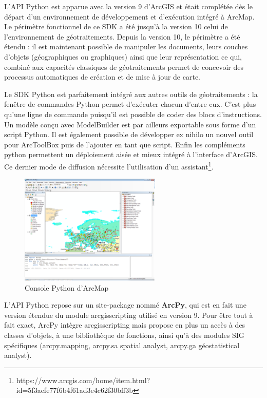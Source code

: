 \documentclass[11pt]{article}
\begin{document}
L'API Python est apparue avec la version 9 d'ArcGIS et était complétée dès le départ d'un environnement de développement et d'exécution intégré à ArcMap. Le périmètre fonctionnel de ce SDK a été jusqu’à la version 10 celui de l’environnement de géotraitements. Depuis la version 10, le périmètre a été étendu : il est maintenant possible de manipuler les documents, leurs couches d’objets (géographiques ou graphiques) ainsi que leur représentation ce qui, combiné aux capacités classiques de géotraitements permet de concevoir des processus automatiques de création et de mise à jour de carte. 

Le SDK Python est parfaitement intégré aux autres outils de géotraitements : la fenêtre de commandes Python permet d’exécuter chacun d’entre eux. C’est plus qu’une ligne de commande puisqu’il est possible de coder des blocs d’instructions. Un modèle conçu avec ModelBuilder est par ailleurs exportable sous forme d’un script Python. Il est également possible de développer ex nihilo un nouvel outil pour ArcToolBox puis de l’ajouter en tant que script. Enfin les compléments python permettent un déploiement aisée et mieux intégré à l'interface d'ArcGIS. Ce dernier mode de diffusion nécessite l'utilisation d'un assistant\footnote{https://www.arcgis.com/home/item.html?id=5f3aefe77f6b4f61ad3e4c62f30bff3b}.

\begin{figure}[H]
	\center \includegraphics[width=0.6\textwidth]{img/cours/console_python.png}
	\caption{Console Python d'ArcMap}
\end{figure}

L’API Python repose sur un site-package nommé \textbf{ArcPy}, qui est en fait une version étendue du module arcgisscripting utilisé en version 9. Pour être tout à fait exact, ArcPy intègre arcgisscripting mais propose en plus un accès à des classes d’objets, à une bibliothèque de fonctions, ainsi qu’à des modules SIG spécifiques (arcpy.mapping, arcpy.sa spatial analyst, arcpy.ga géostatistical analyst).
\end{document}
